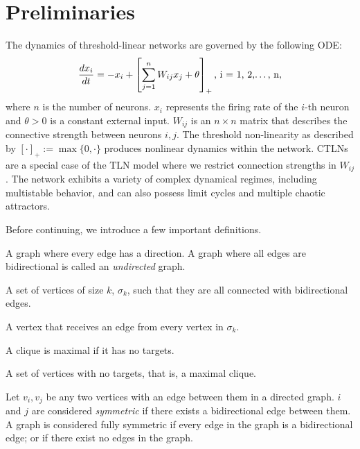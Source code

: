
\section{Preliminaries}
The dynamics of threshold-linear networks are governed by the following ODE:
\[
    \frac{dx_i}{dt} = -x_i + \left[ \sum^{n}_{j=1} W_{ij} x_j + \theta \right]_+ \mbox{, i = 1, 2,\dots, n},
\]
where $n$ is the number of neurons. $x_i$ represents the firing rate of the $i$-th neuron and $\theta>0$ is a constant external input. $W_{ij}$ is an $n\times n$ matrix that describes the connective strength between neurons $i,j$. The threshold non-linearity as described by $[\cdot]_+ := \max\{0,\cdot\}$ produces nonlinear dynamics within the network. CTLNs are a special case of the TLN model where we restrict connection strengths in $W_{ij}$. The network exhibits a variety of complex dynamical regimes, including multistable behavior, and can also possess limit cycles and multiple chaotic attractors.

Before continuing, we introduce a few important definitions.
\begin{defn}
    A graph where every edge has a direction. A graph where all edges are bidirectional is called an \textit{undirected} graph.
\end{defn}

\begin{defn}[Clique]
    A set of vertices of size $k$, $\sigma_k$, such that they are all connected with bidirectional edges.
\end{defn}

\begin{defn}
    A vertex that receives an edge from every vertex in $\sigma_k$.
\end{defn}

\begin{defn}[Maximality]
    A clique is maximal if it has no targets.
\end{defn}

\begin{defn}
    A set of vertices with no targets, that is, a maximal clique.
\end{defn}

\begin{defn}[Symmetry]
    Let $v_i,v_j$ be any two vertices with an edge between them in a directed graph. $i$ and $j$ are considered \textit{symmetric} if there exists a bidirectional edge between them. A graph is considered fully symmetric if every edge in the graph is a bidirectional edge; or if there exist no edges in the graph.
\end{defn}

